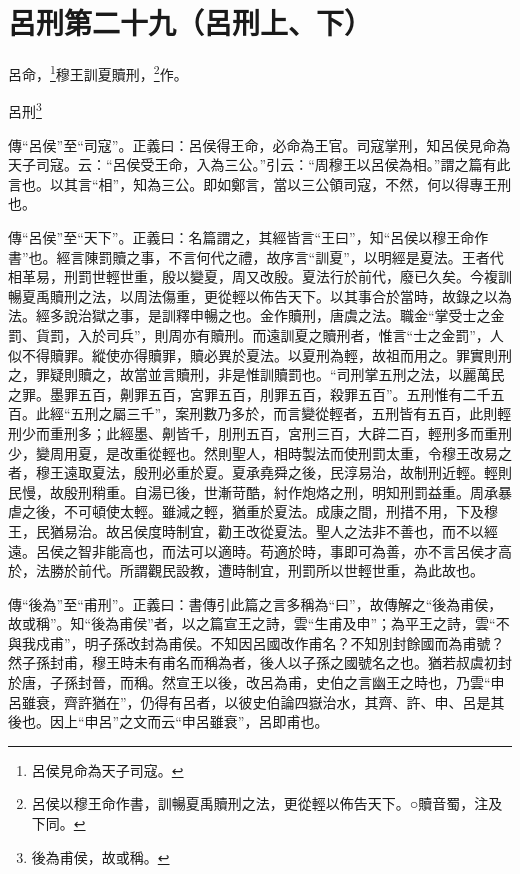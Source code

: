 \section{呂刑第二十九（呂刑上、下）}


呂命，\footnote{呂侯見命為天子司寇。}穆王訓夏贖刑，\footnote{呂侯以穆王命作書，訓暢夏禹贖刑之法，更從輕以佈告天下。○贖音蜀，注及下同。}作。

呂刑\footnote{後為甫侯，故或稱。}


{\noindent\zhuan{}\fzbyks 傳“呂侯”至“司寇”。正義曰：呂侯得王命，必命為王官。司寇掌刑，知呂侯見命為天子司寇。云：“呂侯受王命，入為三公。”引云：“周穆王以呂侯為相。”謂之篇有此言也。以其言“相”，知為三公。即如鄭言，當以三公領司寇，不然，何以得專王刑也。 \par}

{\noindent\zhuan{}\fzbyks 傳“呂侯”至“天下”。正義曰：名篇謂之，其經皆言“王曰”，知“呂侯以穆王命作書”也。經言陳罰贖之事，不言何代之禮，故序言“訓夏”，以明經是夏法。王者代相革易，刑罰世輕世重，殷以變夏，周又改殷。夏法行於前代，廢已久矣。今複訓暢夏禹贖刑之法，以周法傷重，更從輕以佈告天下。以其事合於當時，故錄之以為法。經多說治獄之事，是訓釋申暢之也。金作贖刑，唐虞之法。職金“掌受士之金罰、貨罰，入於司兵”，則周亦有贖刑。而遠訓夏之贖刑者，惟言“士之金罰”，人似不得贖罪。縱使亦得贖罪，贖必異於夏法。以夏刑為輕，故祖而用之。罪實則刑之，罪疑則贖之，故當並言贖刑，非是惟訓贖罰也。“司刑掌五刑之法，以麗萬民之罪。墨罪五百，劓罪五百，宮罪五百，刖罪五百，殺罪五百”。五刑惟有二千五百。此經“五刑之屬三千”，案刑數乃多於，而言變從輕者，五刑皆有五百，此則輕刑少而重刑多；此經墨、劓皆千，刖刑五百，宮刑三百，大辟二百，輕刑多而重刑少，變周用夏，是改重從輕也。然則聖人，相時製法而使刑罰太重，令穆王改易之者，穆王遠取夏法，殷刑必重於夏。夏承堯舜之後，民淳易治，故制刑近輕。輕則民慢，故殷刑稍重。自湯已後，世漸苛酷，紂作炮烙之刑，明知刑罰益重。周承暴虐之後，不可頓使太輕。雖減之輕，猶重於夏法。成康之間，刑措不用，下及穆王，民猶易治。故呂侯度時制宜，勸王改從夏法。聖人之法非不善也，而不以經遠。呂侯之智非能高也，而法可以適時。苟適於時，事即可為善，亦不言呂侯才高於，法勝於前代。所謂觀民設教，遭時制宜，刑罰所以世輕世重，為此故也。 \par}

{\noindent\zhuan{}\fzbyks 傳“後為”至“甫刑”。正義曰：書傳引此篇之言多稱為“曰”，故傳解之“後為甫侯，故或稱”。知“後為甫侯”者，以之篇宣王之詩，雲“生甫及申”；為平王之詩，雲“不與我戍甫”，明子孫改封為甫侯。不知因呂國改作甫名？不知別封餘國而為甫號？然子孫封甫，穆王時未有甫名而稱為者，後人以子孫之國號名之也。猶若叔虞初封於唐，子孫封晉，而稱。然宣王以後，改呂為甫，史伯之言幽王之時也，乃雲“申呂雖衰，齊許猶在”，仍得有呂者，以彼史伯論四嶽治水，其齊、許、申、呂是其後也。因上“申呂”之文而云“申呂雖衰”，呂即甫也。 \par}

